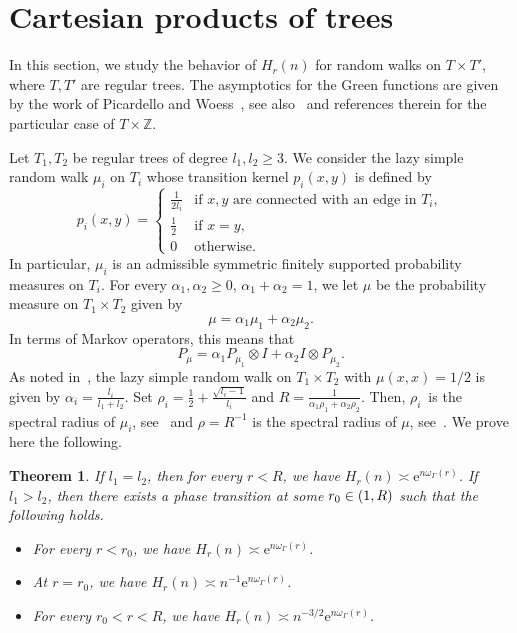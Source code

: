 \documentclass[10pt]{amsart}
\newtheorem{theo}{Theorem}[section]
\theoremstyle{definition}\newtheorem{defi}[theo]{Definition}\newtheorem{rema}[theo]{Remark}\newtheorem{exam}[theo]{Example}\newtheorem{exem}[theo]{Example}\newtheorem{nota}[theo]{Notation}
\newcommand{\Z}{\mathbb{Z}}
\newcommand{\rme}{\mathrm{e}}
\let\oldin\in
\renewcommand{\in}{\mathchoice{\oldin}{\oldin}{\,\oldin\,}{\,\oldin\,}}
\begin{document}
\section{Cartesian products of trees}\label{Sectionbitree}
In this section, we study the behavior of $H_r(n)$ for random walks on $T\times T'$, where $T,T'$ are regular trees. The asymptotics for the Green functions are given by the work of Picardello and Woess~\cite{PicardelloWoessbitree}, see also~\cite[Section~28]{Woessbook} and references therein for the particular case of $T\times \Z$.

Let $T_1,T_2$ be regular trees of degree $l_1,l_2\geq 3$. We consider the lazy simple random walk $\mu_i$ on $T_i$ whose transition kernel $p_i(x,y)$ is defined by
\[
p_i(x,y)=
\begin{cases}
\frac{1}{2l_i} &\text{if } x,y \text{ are connected with an edge in } T_i,\\
\frac{1}{2} &\text{if }x=y,\\
0 &\text{otherwise.}
\end{cases}
\]
In particular, $\mu_i$ is an admissible symmetric finitely supported probability measures on $T_i$. For every $\alpha_1,\alpha_2\geq 0$, $\alpha_1+\alpha_2=1$, we let $\mu$ be the probability measure on $T_1\times T_2$ given by
\begin{equation}\label{defmubitree}
\mu=\alpha_1 \mu_1+\alpha_2\mu_2.
\end{equation}
In terms of Markov operators, this means that
\[
P_{\mu}=\alpha_1 P_{\mu_1}\otimes I+\alpha_2 I\otimes P_{\mu_2}.
\]
As noted in~\cite[Section~3]{PicardelloWoessbitree}, the lazy simple random walk on $T_1\times T_2$ with $\mu(x,x)=1/2$ is given by $\alpha_i=\frac{l_i}{l_1+l_2}$. Set $\rho_i = \frac{1}{2} + \frac{\sqrt{l_i - 1}}{l_i}$ and $R = \frac{1}{\alpha_1 \rho_1 + \alpha_2 \rho_2}$. Then, $\rho_i$~is the spectral radius of $\mu_i$, see~\cite[(2.2)]{PicardelloWoessbitree} and $\rho=R^{-1}$ is the spectral radius of $\mu$, see~\cite[Section~3]{PicardelloWoessbitree}. We prove here the following.

\begin{theo}\label{thmbitree}
If $l_1=l_2$, then for every $r<R$, we have $H_r(n)\asymp \rme^{n\omega_\Gamma(r)}$. If $l_1>l_2$, then there exists a phase transition at some $r_0\in (1,R)$ such that the following holds.
\begin{itemize}
\item For every $r<r_0$, we have $H_r(n)\asymp \rme^{n\omega_\Gamma(r)}$.
\item At $r=r_0$, we have $H_r(n)\asymp n^{-1}\rme^{n\omega_\Gamma(r)}$.
\item For every $r_0<r<R$, we have $H_r(n)\asymp n^{-3/2}\rme^{n\omega_\Gamma(r)}$.
\end{itemize}
\end{theo}
\end{document}
